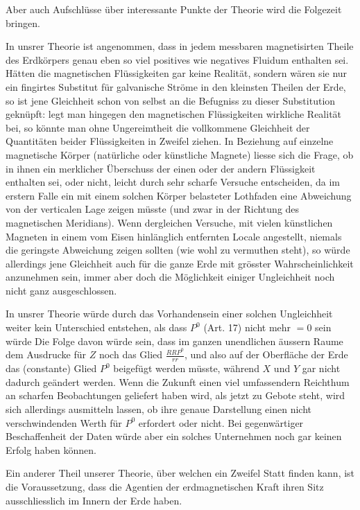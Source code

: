 Aber auch Aufschlüsse über interessante Punkte der Theorie wird die Folgezeit bringen.

In unsrer Theorie ist angenommen, dass in jedem messbaren magnetisirten Theile des Erdkörpers genau eben so viel positives wie negatives Fluidum enthalten sei. Hätten die magnetischen Flüssigkeiten gar keine Realität, sondern wären sie nur ein fingirtes Substitut für galvanische Ströme in den kleinsten Theilen der Erde, so ist jene Gleichheit schon von selbst an die Befugniss zu dieser Substitution geknüpft: legt man hingegen den magnetischen Flüssigkeiten wirkliche Realität bei, so könnte man ohne Ungereimtheit die vollkommene Gleichheit der Quantitäten beider Flüssigkeiten in Zweifel ziehen. In Beziehung auf einzelne magnetische Körper (natürliche oder künstliche Magnete) liesse sich die Frage, ob in ihnen ein merklicher Überschuss der einen oder der andern Flüssigkeit enthalten sei, oder nicht, leicht durch sehr scharfe Versuche entscheiden, da im erstern Falle ein mit einem solchen Körper belasteter Lothfaden eine Abweichung von der verticalen Lage zeigen müsste (und zwar in der Richtung des magnetischen Meridians). Wenn dergleichen Versuche, mit vielen künstlichen Magneten in einem vom Eisen hinlänglich entfernten Locale angestellt, niemals die geringste Abweichung zeigen sollten (wie wohl zu vermuthen steht), so würde allerdings jene Gleichheit auch für die ganze Erde mit grösster Wahrscheinlichkeit anzunehmen sein, immer aber doch die Möglichkeit einiger Ungleichheit noch nicht ganz ausgeschlossen.

In unsrer Theorie würde durch das Vorhandensein einer solchen Ungleichheit weiter kein Unterschied entstehen, als dass $P^0$ (Art. 17) nicht mehr $=0$ sein würde Die Folge davon würde sein, dass im ganzen unendlichen äussern Raume dem Ausdrucke für $Z$ noch das Glied $\frac{RRP^0}{rr}$, und also auf der Oberfläche der Erde das (constante) Glied $P^0$ beigefügt werden müsste, während $X$ und $Y$ gar nicht dadurch geändert werden. Wenn die Zukunft einen viel umfassendern Reichthum an scharfen Beobachtungen geliefert haben wird, als jetzt zu Gebote steht, wird sich allerdings ausmitteln lassen, ob ihre genaue Darstellung einen nicht verschwindenden Werth für $P^0$ erfordert oder nicht. Bei gegenwärtiger Beschaffenheit der Daten würde aber ein solches Unternehmen noch gar keinen Erfolg haben können.

\par\clearpage
{}
Ein anderer Theil unserer Theorie, über welchen ein Zweifel Statt finden kann, ist die Voraussetzung, dass die Agentien der erdmagnetischen Kraft ihren Sitz ausschliesslich im Innern der Erde haben.

